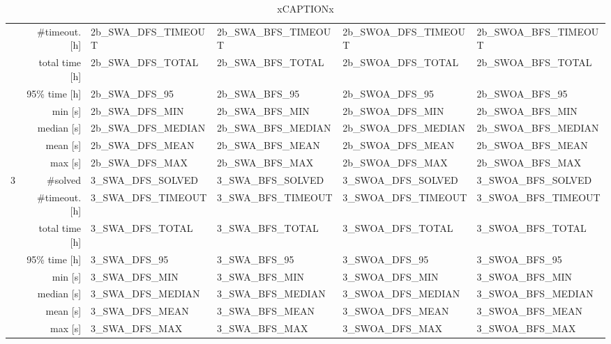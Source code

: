 \begin{table}
{{\begin{tabular}{|l|r|l|l|l|l|}
                      & \#timeout. [h] & 2b_SWA_DFS_TIMEOUT    & 2b_SWA_BFS_TIMEOUT    & 2b_SWOA_DFS_TIMEOUT   & 2b_SWOA_BFS_TIMEOUT    \\
                      & total time [h] & 2b_SWA_DFS_TOTAL      & 2b_SWA_BFS_TOTAL      & 2b_SWOA_DFS_TOTAL     & 2b_SWOA_BFS_TOTAL      \\
                      & 95\% time [h]  & 2b_SWA_DFS_95         & 2b_SWA_BFS_95         & 2b_SWOA_DFS_95        & 2b_SWOA_BFS_95         \\
\cline{2-6}
                      & min [s]        & 2b_SWA_DFS_MIN        & 2b_SWA_BFS_MIN        & 2b_SWOA_DFS_MIN       & 2b_SWOA_BFS_MIN        \\
                      & median [s]     & 2b_SWA_DFS_MEDIAN     & 2b_SWA_BFS_MEDIAN     & 2b_SWOA_DFS_MEDIAN    & 2b_SWOA_BFS_MEDIAN     \\
                      & mean [s]       & 2b_SWA_DFS_MEAN       & 2b_SWA_BFS_MEAN       & 2b_SWOA_DFS_MEAN      & 2b_SWOA_BFS_MEAN       \\
                      & max [s]        & 2b_SWA_DFS_MAX        & 2b_SWA_BFS_MAX        & 2b_SWOA_DFS_MAX       & 2b_SWOA_BFS_MAX        \\
\hline
\hline
\multirow{8}{*}{3}    & \#solved & 3_SWA_DFS_SOLVED     & 3_SWA_BFS_SOLVED     & 3_SWOA_DFS_SOLVED    & 3_SWOA_BFS_SOLVED     \\
                      & \#timeout. [h] & 3_SWA_DFS_TIMEOUT     & 3_SWA_BFS_TIMEOUT     & 3_SWOA_DFS_TIMEOUT    & 3_SWOA_BFS_TIMEOUT     \\
                      & total time [h] & 3_SWA_DFS_TOTAL       & 3_SWA_BFS_TOTAL       & 3_SWOA_DFS_TOTAL      & 3_SWOA_BFS_TOTAL       \\
                      & 95\% time [h]  & 3_SWA_DFS_95          & 3_SWA_BFS_95          & 3_SWOA_DFS_95         & 3_SWOA_BFS_95          \\
\cline{2-6}
                      & min [s]        & 3_SWA_DFS_MIN         & 3_SWA_BFS_MIN         & 3_SWOA_DFS_MIN        & 3_SWOA_BFS_MIN         \\
                      & median [s]     & 3_SWA_DFS_MEDIAN      & 3_SWA_BFS_MEDIAN      & 3_SWOA_DFS_MEDIAN     & 3_SWOA_BFS_MEDIAN      \\
                      & mean [s]       & 3_SWA_DFS_MEAN        & 3_SWA_BFS_MEAN        & 3_SWOA_DFS_MEAN       & 3_SWOA_BFS_MEAN        \\
                      & max [s]        & 3_SWA_DFS_MAX         & 3_SWA_BFS_MAX         & 3_SWOA_DFS_MAX        & 3_SWOA_BFS_MAX         \\
\hline
\end{tabular}}}
\caption{xCAPTIONx}
\end{table}